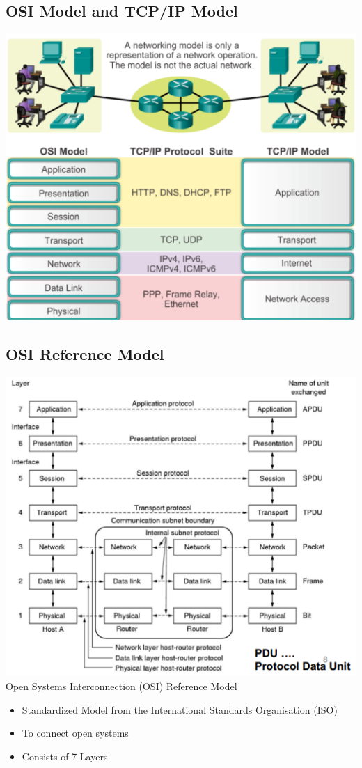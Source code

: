 \documentclass[11pt]{article}
\begin{document}
\subsection{OSI Model and TCP/IP Model}
\includegraphics[width=\textwidth]{osi-and-tcp-ip-model}
\subsection{OSI Reference Model}
\includegraphics[width=\textwidth]{osi-reference-model}
Open Systems Interconnection (OSI) Reference Model
\begin{itemize}
    \item Standardized Model from the International Standards Organisation (ISO) 
    \item To connect open systems
    \item Consists of 7 Layers
\end{itemize}
\end{document}
